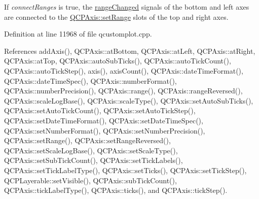 If {\itshape connect\+Ranges} is true, the \hyperlink{class_q_c_p_axis_a0894084e4c16a1736534c4095746f910}{range\+Changed} signals of the bottom and left axes are connected to the \hyperlink{class_q_c_p_axis_aebdfea5d44c3a0ad2b4700cd4d25b641}{Q\+C\+P\+Axis\+::set\+Range} slots of the top and right axes. 

Definition at line 11968 of file qcustomplot.\+cpp.



References add\+Axis(), Q\+C\+P\+Axis\+::at\+Bottom, Q\+C\+P\+Axis\+::at\+Left, Q\+C\+P\+Axis\+::at\+Right, Q\+C\+P\+Axis\+::at\+Top, Q\+C\+P\+Axis\+::auto\+Sub\+Ticks(), Q\+C\+P\+Axis\+::auto\+Tick\+Count(), Q\+C\+P\+Axis\+::auto\+Tick\+Step(), axis(), axis\+Count(), Q\+C\+P\+Axis\+::date\+Time\+Format(), Q\+C\+P\+Axis\+::date\+Time\+Spec(), Q\+C\+P\+Axis\+::number\+Format(), Q\+C\+P\+Axis\+::number\+Precision(), Q\+C\+P\+Axis\+::range(), Q\+C\+P\+Axis\+::range\+Reversed(), Q\+C\+P\+Axis\+::scale\+Log\+Base(), Q\+C\+P\+Axis\+::scale\+Type(), Q\+C\+P\+Axis\+::set\+Auto\+Sub\+Ticks(), Q\+C\+P\+Axis\+::set\+Auto\+Tick\+Count(), Q\+C\+P\+Axis\+::set\+Auto\+Tick\+Step(), Q\+C\+P\+Axis\+::set\+Date\+Time\+Format(), Q\+C\+P\+Axis\+::set\+Date\+Time\+Spec(), Q\+C\+P\+Axis\+::set\+Number\+Format(), Q\+C\+P\+Axis\+::set\+Number\+Precision(), Q\+C\+P\+Axis\+::set\+Range(), Q\+C\+P\+Axis\+::set\+Range\+Reversed(), Q\+C\+P\+Axis\+::set\+Scale\+Log\+Base(), Q\+C\+P\+Axis\+::set\+Scale\+Type(), Q\+C\+P\+Axis\+::set\+Sub\+Tick\+Count(), Q\+C\+P\+Axis\+::set\+Tick\+Labels(), Q\+C\+P\+Axis\+::set\+Tick\+Label\+Type(), Q\+C\+P\+Axis\+::set\+Ticks(), Q\+C\+P\+Axis\+::set\+Tick\+Step(), Q\+C\+P\+Layerable\+::set\+Visible(), Q\+C\+P\+Axis\+::sub\+Tick\+Count(), Q\+C\+P\+Axis\+::tick\+Label\+Type(), Q\+C\+P\+Axis\+::ticks(), and Q\+C\+P\+Axis\+::tick\+Step().



